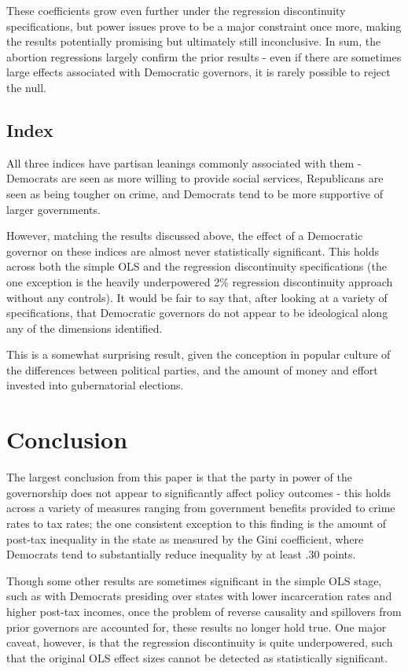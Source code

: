 \documentclass{article}
\begin{document}
These coefficients grow even further under the regression discontinuity specifications, but power issues prove to be a major constraint once more, making the results potentially promising but ultimately still inconclusive. In sum, the abortion regressions largely confirm the prior results - even if there are sometimes large effects associated with Democratic governors, it is rarely possible to reject the null. 
 
\subsection{Index}

All three indices have partisan leanings commonly associated with them - Democrats are seen as more willing to provide social services, Republicans are seen as being tougher on crime, and Democrats tend to be more supportive of larger governments. 

However, matching the results discussed above, the effect of a Democratic governor on these indices are almost never statistically significant. This holds across both the simple OLS and the regression discontinuity specifications (the one exception is the heavily underpowered 2\% regression discontinuity approach without any controls). It would be fair to say that, after looking at a variety of specifications, that Democratic governors do not appear to be ideological along any of the dimensions identified. 

This is a somewhat surprising result, given the conception in popular culture of the differences between political parties, and the amount  of money and effort invested into gubernatorial elections. 


\section{Conclusion}

The largest conclusion from this paper is that the party in power of the governorship does not appear to significantly affect policy outcomes - this holds across a variety of measures ranging from government benefits provided to crime rates to tax rates; the one consistent exception to this finding is the amount of post-tax inequality in the state as measured by the Gini coefficient, where Democrats tend to substantially reduce inequality by at least .30 points. 

Though some other results are sometimes significant in the simple OLS stage, such as with Democrats presiding over states with lower incarceration rates and higher post-tax incomes, once the problem of reverse causality and spillovers from prior governors are accounted for, these results no longer hold true. One major caveat, however, is that the regression discontinuity is quite underpowered, such that the original OLS effect sizes cannot be detected as statistically significant. 
\end{document}
